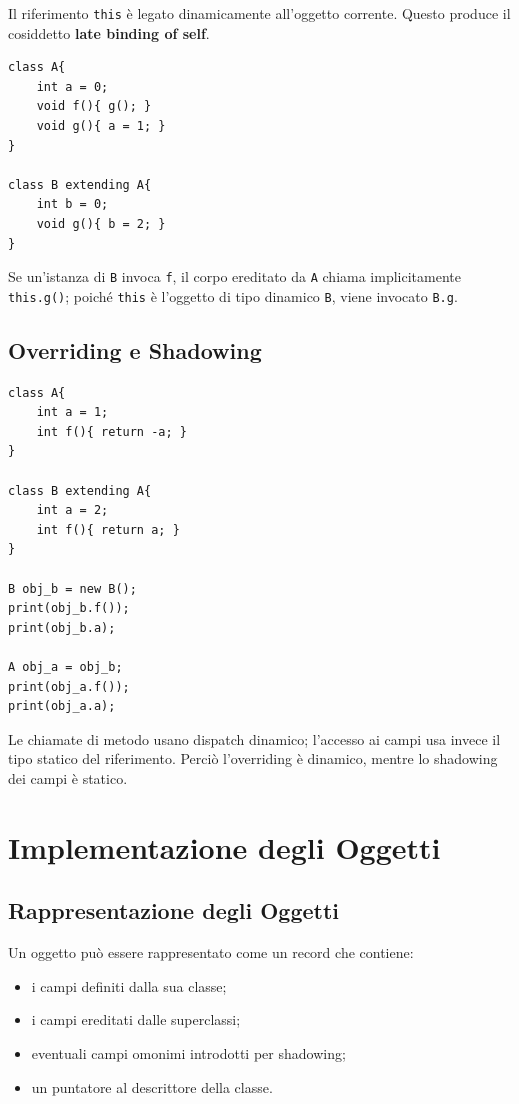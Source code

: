 \documentclass{article}
\begin{document}
Il riferimento \texttt{this} è legato dinamicamente all'oggetto corrente. Questo produce il cosiddetto \textbf{late binding of self}.

\begin{lstlisting}
class A{
    int a = 0;
    void f(){ g(); }
    void g(){ a = 1; }
}

class B extending A{
    int b = 0;
    void g(){ b = 2; }
}
\end{lstlisting}

Se un'istanza di \texttt{B} invoca \texttt{f}, il corpo ereditato da \texttt{A} chiama implicitamente \texttt{this.g()}; poiché \texttt{this} è l'oggetto di tipo dinamico \texttt{B}, viene invocato \texttt{B.g}.

\subsection{Overriding e Shadowing}

\begin{lstlisting}
class A{
    int a = 1;
    int f(){ return -a; }
}

class B extending A{
    int a = 2;
    int f(){ return a; }
}

B obj_b = new B();
print(obj_b.f());
print(obj_b.a);

A obj_a = obj_b;
print(obj_a.f());
print(obj_a.a);
\end{lstlisting}

Le chiamate di metodo usano dispatch dinamico; l'accesso ai campi usa invece il tipo statico del riferimento. Perciò l'overriding è dinamico, mentre lo shadowing dei campi è statico.

\section{Implementazione degli Oggetti}

\subsection{Rappresentazione degli Oggetti}

Un oggetto può essere rappresentato come un record che contiene:
\begin{itemize}
  \item i campi definiti dalla sua classe;
  \item i campi ereditati dalle superclassi;
  \item eventuali campi omonimi introdotti per shadowing;
  \item un puntatore al descrittore della classe.
\end{itemize}
\end{document}
